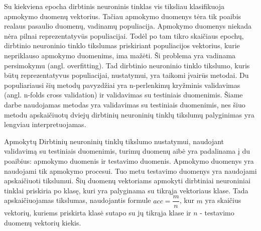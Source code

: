 Su kiekviena epocha dirbtinis neuroninis tinklas vis tiksliau klasifikuoja apmokymo duomenų vektorius. Tačiau apmokymo duomenys tėra tik poaibis realaus pasaulio duomenų, vadinamų populiacija. Apmokymo duomenys niekada nėra pilnai reprezentatyvūs populiacijai. Todėl po tam tikro skaičiaus epochų, dirbtinio neuroninio tinklo tikslumas priskiriant populiacijos vektorius, kurie nepriklauso apmokymo duomenims, ima mažėti. Ši problema yra vadinama persimokymu (angl. overfitting). Tad dirbtinio neuroninio tinklo tikslumo, kuris būtų reprezentatyvus populiacijai, nustatymui, yra taikomi įvairūs metodai. Du populiariausi šių metodų pavyzdžiai yra n-perlenkimų kryžminis validavimas (angl. n-folds cross validation) ir validavimas su testiniais duomenimis. Šiame darbe naudojamas metodas yra validavimas su testiniais duomenimis, nes šiuo metodu apskaičiuotų dviejų dirbtinių neuroninių tinklų tikslumų palyginimas yra lengviau interpretuojamas.

Apmokytų Dirbtinių neuroninių tinklų tikslumo nustatymui, naudojant validavimą su testiniais duomenimis, turimų duomenų aibė yra padalinama į du poaibius: apmokymo duomenis ir testavimo duomenis.  Apmokymo duomenys yra naudojami tik apmokymo procesui. Tuo metu testavimo duomenys yra naudojami apskaičiuoti tikslumui. Šių duomenų vektoriams apmokyti dirbtiniai neuroniniai tinklai priskiria po klasę, kuri yra palyginama su tikrąja vektoriaus klase. Tada apskaičiuojamas tikslumas, naudojantis formule $acc = \dfrac{m}{n}$, kur $m$ yra skaičius vektorių, kuriems priskirta klasė sutapo su jų tikrąja klase ir $n$ - testavimo duomenų vektorių kiekis.
